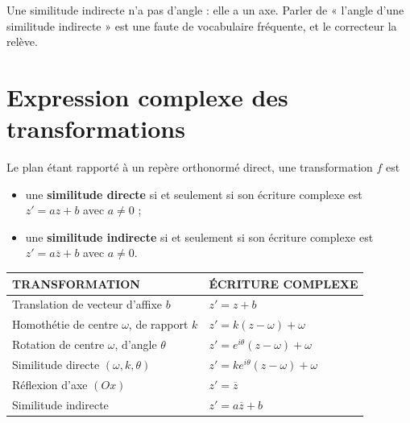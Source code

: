 \begin{avertissement}
Une similitude indirecte n'a pas d'angle : elle a un axe. Parler de « l'angle
d'une similitude indirecte » est une faute de vocabulaire fréquente, et le
correcteur la relève.
\end{avertissement}

\section{Expression complexe des transformations}

\begin{theoreme}
Le plan étant rapporté à un repère orthonormé direct, une transformation $f$
est
\begin{itemize}[leftmargin=*, itemsep=0.1em]
  \item une \textbf{similitude directe} si et seulement si son écriture
        complexe est $z' = az+b$ avec $a \neq 0$ ;
  \item une \textbf{similitude indirecte} si et seulement si son écriture
        complexe est $z' = a\overline z+b$ avec $a \neq 0$.
\end{itemize}
\end{theoreme}

\begin{propriete}
\begin{center}
\setlength{\tabcolsep}{9pt}
\renewcommand{\arraystretch}{1.3}
\begin{tabular}{@{}ll@{}}
\toprule
\textsf{\footnotesize\bfseries TRANSFORMATION} &
\textsf{\footnotesize\bfseries ÉCRITURE COMPLEXE} \\
\midrule
Translation de vecteur d'affixe $b$ & $z' = z+b$ \\
Homothétie de centre $\omega$, de rapport $k$ &
  $z' = k(z-\omega)+\omega$ \\
Rotation de centre $\omega$, d'angle $\theta$ &
  $z' = e^{i\theta}(z-\omega)+\omega$ \\
Similitude directe $(\omega,k,\theta)$ &
  $z' = ke^{i\theta}(z-\omega)+\omega$ \\
Réflexion d'axe $(Ox)$ & $z' = \overline z$ \\
Similitude indirecte & $z' = a\overline z+b$ \\
\bottomrule
\end{tabular}
\end{center}
\end{propriete}

